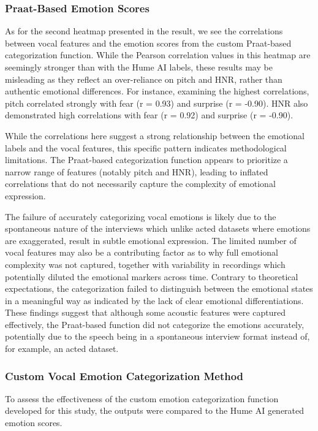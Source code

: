 \subsubsection{Praat-Based Emotion Scores}
As for the second heatmap presented in the result, we see the correlations between vocal features and the emotion scores from the custom Praat-based categorization function. While the Pearson correlation values in this heatmap are seemingly stronger than with the Hume AI labels, these results may be misleading as they reflect an over-reliance on pitch and HNR, rather than authentic emotional differences.
For instance, examining the highest correlations, pitch correlated strongly with fear (r = 0.93) and surprise (r = -0.90). HNR also demonstrated high correlations with fear (r = 0.92) and surprise (r = -0.90). 

While the correlations here suggest a strong relationship between the emotional labels and the vocal features, this specific pattern indicates methodological limitations. The Praat-based categorization function appears to prioritize a narrow range of features (notably pitch and HNR), leading to inflated correlations that do not necessarily capture the complexity of emotional expression.

The failure of accurately categorizing vocal emotions is likely due to the spontaneous nature of the interviews which unlike acted datasets where emotions are exaggerated, result in subtle emotional expression. The limited number of vocal features may also be a contributing factor as to why full emotional complexity was not captured, together with variability in recordings which potentially diluted the emotional markers across time.
Contrary to theoretical expectations, the categorization failed to distinguish between the emotional states in a meaningful way as indicated by the lack of clear emotional differentiations. These findings suggest that although some acoustic features were captured effectively, the Praat-based function did not categorize the emotions accurately, potentially due to the speech being in a spontaneous interview format instead of, for example, an acted dataset. 

\subsubsection{Custom Vocal Emotion Categorization Method}
To assess the effectiveness of the custom emotion categorization function developed for this study, the outputs were compared to the Hume AI generated emotion scores.

